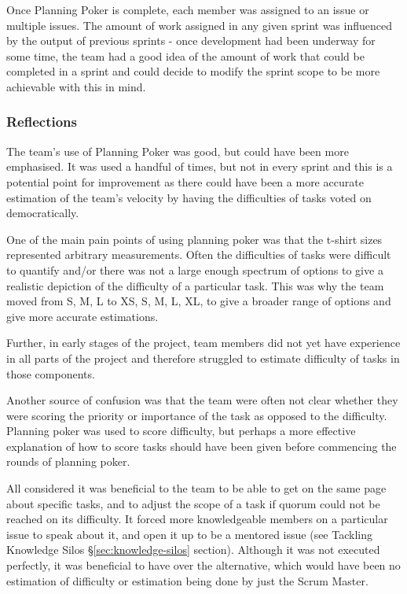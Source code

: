 \documentclass{l3proj}
\begin{document}
Once Planning Poker is complete, each member was assigned to an issue or multiple issues. The amount of work assigned in any given sprint was influenced by the output of previous sprints - once development had been underway for some time, the team had a good idea of the amount of work that could be completed in a sprint and could decide to modify the sprint scope to be more achievable with this in mind.

\subsubsection{Reflections}
The team's use of Planning Poker was good, but could have been more emphasised. It was used a handful of times, but not in every sprint and this is a potential point for improvement as there could have been a more accurate estimation of the team's velocity by having the difficulties of tasks voted on democratically.

One of the main pain points of using planning poker was that the t-shirt sizes represented arbitrary measurements. Often the difficulties of tasks were difficult to quantify and/or there was not a large enough spectrum of options to give a realistic depiction of the difficulty of a particular task. This was why the team moved from S, M, L to XS, S, M, L, XL, to give a broader range of options and give more accurate estimations.

Further, in early stages of the project, team members did not yet have experience in all parts of the project and therefore struggled to estimate difficulty of tasks in those components.

Another source of confusion was that the team were often not clear whether they were scoring the priority or importance of the task as opposed to the difficulty. Planning poker was used to score difficulty, but perhaps a more effective explanation of how to score tasks should have been given before commencing the rounds of planning poker.

All considered it was beneficial to the team to be able to get on the same page about specific tasks, and to adjust the scope of a task if quorum could not be reached on its difficulty. It forced more knowledgeable members on a particular issue to speak about it, and open it up to be a mentored issue (see Tackling Knowledge Silos \S\ref{sec:knowledge-silos} section). Although it was not executed perfectly, it was beneficial to have over the alternative, which would have been no estimation of difficulty or estimation being done by just the Scrum Master.
\end{document}
